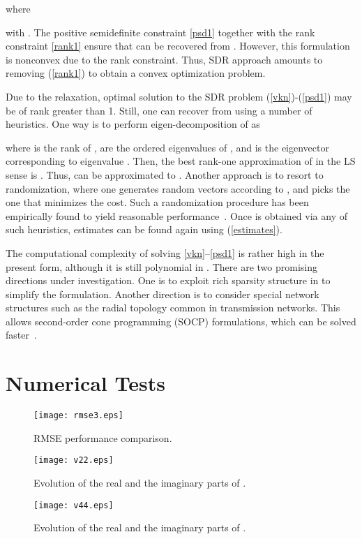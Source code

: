 \documentclass[conference]{IEEEtran}
\begin{document}
where

with . The positive semidefinite constraint \eqref{psd1} together with the rank constraint \eqref{rank1} ensure that  can be recovered from . However, this formulation is nonconvex due to the rank constraint. Thus, SDR approach amounts to removing (\ref{rank1}) to obtain a convex optimization problem.

Due to the relaxation, optimal solution  to the SDR problem (\ref{vkn})-(\ref{psd1}) may be of rank greater than 1. Still, one can recover   from  using a number of heuristics. One way is to perform eigen-decomposition of  as
 
where  is the rank of ,  are the ordered eigenvalues of , and  is the eigenvector corresponding to  eigenvalue . Then, the best rank-one approximation of  in the LS sense is . Thus,  can be approximated to .
Another approach is to resort to randomization, where one generates random vectors according to , and picks the one that minimizes the cost.
Such a randomization procedure has been empirically found to yield reasonable performance~\cite{spm:luo2010}. Once  is obtained via any of such heuristics, estimates   can be found again using (\ref{estimates}).

The computational complexity of solving \eqref{vkn}--\eqref{psd1} is rather high in the present form, although it is still polynomial in . There are two promising directions under investigation. One is to exploit rich sparsity structure in  to simplify the formulation. Another direction is to consider special network structures such as the radial topology common in transmission networks. This allows second-order cone programming (SOCP) formulations, which can be solved faster~\cite{Far13}.

\section{Numerical Tests}
\label{sec5}


 \begin{figure}
\centering
\texttt{[image: rmse3.eps]}
\caption{RMSE performance comparison.}
\label{fig1}
\end{figure}

 \begin{figure}
\centering
\texttt{[image: v22.eps]}
\caption{Evolution of the real and the imaginary parts of .}
\label{fig2}
\end{figure}

 \begin{figure}
\centering
\texttt{[image: v44.eps]}
\caption{Evolution of the real and the imaginary parts of .}
\label{fig3}
\end{figure}
\end{document}
